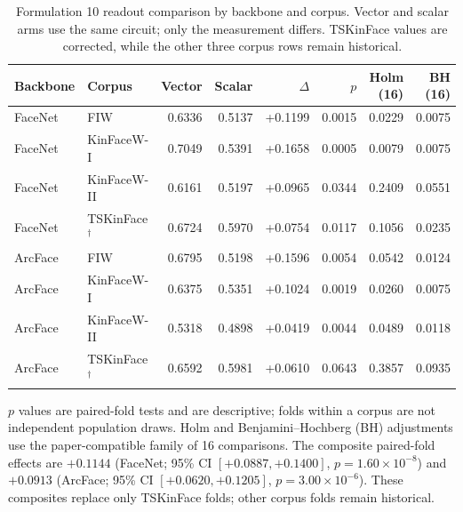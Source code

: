 \begin{table}[!t]
\centering
\caption{Formulation 10 readout comparison by backbone and corpus. Vector and scalar arms use the same circuit; only the measurement differs. TSKinFace values are corrected, while the other three corpus rows remain historical.}
\label{tab:readout_corrected}
\small
\begin{tabular}{llrrrrrr}
\toprule
Backbone & Corpus & Vector & Scalar & \(\Delta\) & \(p\) & Holm (16) & BH (16) \\
\midrule
FaceNet & FIW & 0.6336 & 0.5137 & +0.1199 & 0.0015 & 0.0229 & 0.0075 \\
FaceNet & KinFaceW-I & 0.7049 & 0.5391 & +0.1658 & 0.0005 & 0.0079 & 0.0075 \\
FaceNet & KinFaceW-II & 0.6161 & 0.5197 & +0.0965 & 0.0344 & 0.2409 & 0.0551 \\
FaceNet & TSKinFace$^\dagger$ & 0.6724 & 0.5970 & +0.0754 & 0.0117 & 0.1056 & 0.0235 \\
\midrule
ArcFace & FIW & 0.6795 & 0.5198 & +0.1596 & 0.0054 & 0.0542 & 0.0124 \\
ArcFace & KinFaceW-I & 0.6375 & 0.5351 & +0.1024 & 0.0019 & 0.0260 & 0.0075 \\
ArcFace & KinFaceW-II & 0.5318 & 0.4898 & +0.0419 & 0.0044 & 0.0489 & 0.0118 \\
ArcFace & TSKinFace$^\dagger$ & 0.6592 & 0.5981 & +0.0610 & 0.0643 & 0.3857 & 0.0935 \\
\bottomrule
\end{tabular}
\vspace{1mm}
\begin{minipage}{0.98\textwidth}
\footnotesize
\(p\) values are paired-fold tests and are descriptive; folds within a corpus are not independent population draws. Holm and Benjamini--Hochberg (BH) adjustments use the paper-compatible family of 16 comparisons. The composite paired-fold effects are \(+0.1144\) (FaceNet; 95\% CI \([+0.0887,+0.1400]\), \(p=1.60\times10^{-8}\)) and \(+0.0913\) (ArcFace; 95\% CI \([+0.0620,+0.1205]\), \(p=3.00\times10^{-6}\)). These composites replace only TSKinFace folds; other corpus folds remain historical.
\end{minipage}
\end{table}
